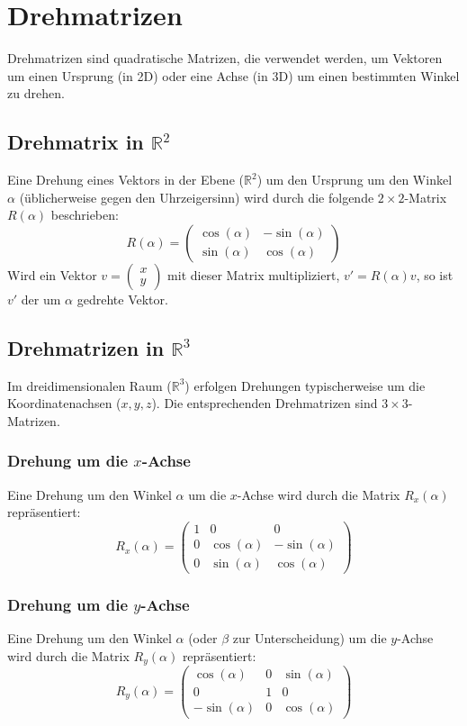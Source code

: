 \section{Drehmatrizen}

Drehmatrizen sind quadratische Matrizen, die verwendet werden, um Vektoren um einen Ursprung (in 2D) oder eine Achse (in 3D) um einen bestimmten Winkel zu drehen.

\subsection*{Drehmatrix in $\mathbb{R}^2$}
Eine Drehung eines Vektors in der Ebene ($\mathbb{R}^2$) um den Ursprung um den Winkel $\alpha$ (üblicherweise gegen den Uhrzeigersinn) wird durch die folgende $2 \times 2$-Matrix $R(\alpha)$ beschrieben:
\[
   R(\alpha) = \begin{pmatrix}
       \cos(\alpha) & -\sin(\alpha) \\
       \sin(\alpha) & \cos(\alpha)
   \end{pmatrix}
\]
Wird ein Vektor $v = \begin{pmatrix} x \\ y \end{pmatrix}$ mit dieser Matrix multipliziert, $v' = R(\alpha)v$, so ist $v'$ der um $\alpha$ gedrehte Vektor.

\subsection*{Drehmatrizen in $\mathbb{R}^3$}
Im dreidimensionalen Raum ($\mathbb{R}^3$) erfolgen Drehungen typischerweise um die Koordinatenachsen ($x, y, z$). Die entsprechenden Drehmatrizen sind $3 \times 3$-Matrizen.

\subsubsection*{Drehung um die $x$-Achse}
Eine Drehung um den Winkel $\alpha$ um die $x$-Achse wird durch die Matrix $R_x(\alpha)$ repräsentiert:
\[
   R_x(\alpha) = \begin{pmatrix}
       1 & 0 & 0 \\
       0 & \cos(\alpha) & -\sin(\alpha) \\
       0 & \sin(\alpha) & \cos(\alpha)
   \end{pmatrix}
\]

\subsubsection*{Drehung um die $y$-Achse}
Eine Drehung um den Winkel $\alpha$ (oder $\beta$ zur Unterscheidung) um die $y$-Achse wird durch die Matrix $R_y(\alpha)$ repräsentiert:
\[
   R_y(\alpha) = \begin{pmatrix}
       \cos(\alpha) & 0 & \sin(\alpha) \\
       0 & 1 & 0 \\
       -\sin(\alpha) & 0 & \cos(\alpha)
   \end{pmatrix}
\]

